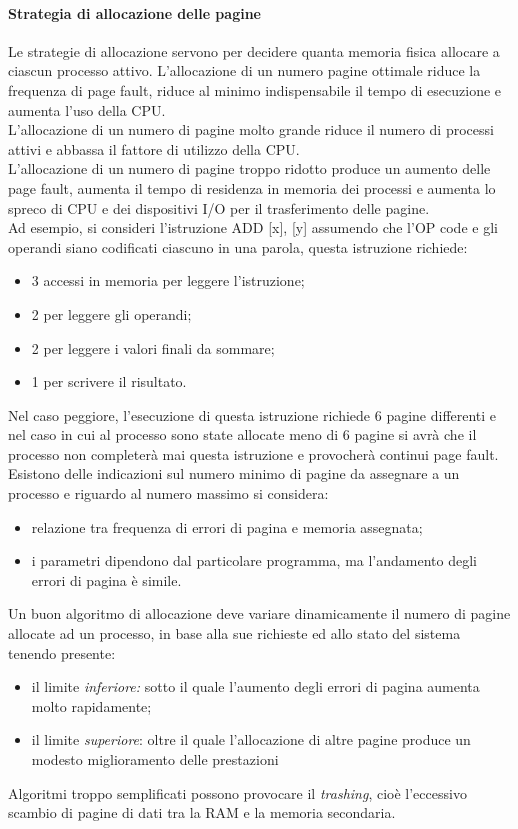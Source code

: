 \documentclass[12pt, letterpaper]{report}
\begin{document}
	\paragraph{Strategia di allocazione delle pagine} Le strategie di allocazione servono per decidere quanta memoria fisica allocare a ciascun processo attivo. L'allocazione di un numero pagine ottimale riduce la frequenza di page fault, riduce al minimo indispensabile il tempo di esecuzione e aumenta l'uso della CPU. \\
	L'allocazione di un numero di pagine molto grande riduce il numero di processi attivi e abbassa il fattore di utilizzo della CPU. \\
	L'allocazione di un numero di pagine troppo ridotto produce un aumento delle page fault, aumenta il tempo di residenza in memoria dei processi e aumenta lo spreco di CPU e dei dispositivi I/O per il trasferimento delle pagine. \\
	Ad esempio, si consideri l'istruzione ADD [x], [y] assumendo che l'OP code e gli operandi siano codificati ciascuno in una parola, questa istruzione richiede:
	\begin{itemize}
		\item 3 accessi in memoria per leggere l'istruzione;
		\item 2 per leggere gli operandi;
		\item 2 per leggere i valori finali da sommare;
		\item 1 per scrivere il risultato.
	\end{itemize}
	Nel caso peggiore, l'esecuzione di questa istruzione richiede 6 pagine differenti e nel caso in cui al processo sono state allocate meno di 6 pagine si avrà che il processo non completerà mai questa istruzione e provocherà continui page fault. \\
	Esistono delle indicazioni sul numero minimo di pagine da assegnare a un processo e riguardo al numero massimo si considera:
	\begin{itemize}
		\item relazione tra frequenza di errori di pagina e memoria assegnata;
		\item i parametri dipendono dal particolare programma, ma l'andamento degli errori di pagina è simile.
	\end{itemize}
	Un buon algoritmo di allocazione deve variare dinamicamente il numero di pagine allocate ad un processo, in base alla sue richieste ed allo stato del sistema tenendo presente:
	\begin{itemize}
		\item il limite \textit{inferiore:} sotto il quale l'aumento degli errori di pagina aumenta molto rapidamente;
		\item il limite \textit{superiore}: oltre il quale l'allocazione di altre pagine produce un modesto miglioramento delle prestazioni
	\end{itemize}
	Algoritmi troppo semplificati possono provocare il \textit{trashing}, cioè l'eccessivo scambio di pagine di dati tra la RAM e la memoria secondaria.
\end{document}
